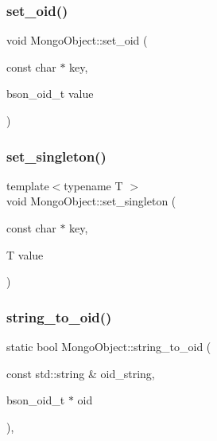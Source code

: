 \mbox{\label{class_mongo_object_a9e80e38e5a4f40754ef48f2504e1613c}} 
\subsubsection{\texorpdfstring{set\+\_\+oid()}{set\_oid()}}
{\footnotesize\ttfamily void Mongo\+Object\+::set\+\_\+oid (\begin{DoxyParamCaption}\item[{const char $\ast$}]{key,  }\item[{bson\+\_\+oid\+\_\+t}]{value }\end{DoxyParamCaption})}

\mbox{\label{class_mongo_object_a03a0d78b1f206aca81ff746edcd57c81}} 
\subsubsection{\texorpdfstring{set\+\_\+singleton()}{set\_singleton()}}
{\footnotesize\ttfamily template$<$typename T $>$ \\
void Mongo\+Object\+::set\+\_\+singleton (\begin{DoxyParamCaption}\item[{const char $\ast$}]{key,  }\item[{T}]{value }\end{DoxyParamCaption})\hspace{0.3cm}{\ttfamily [inline]}}

\mbox{\label{class_mongo_object_ae9bff3fe8b82864f36e6cb7aa8f159b0}} 
\subsubsection{\texorpdfstring{string\+\_\+to\+\_\+oid()}{string\_to\_oid()}}
{\footnotesize\ttfamily static bool Mongo\+Object\+::string\+\_\+to\+\_\+oid (\begin{DoxyParamCaption}\item[{const std\+::string \&}]{oid\+\_\+string,  }\item[{bson\+\_\+oid\+\_\+t $\ast$}]{oid }\end{DoxyParamCaption})\hspace{0.3cm}{\ttfamily [static]}, {\ttfamily [protected]}}

